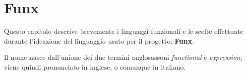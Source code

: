 \chapter{Funx}
\label{chap:2-funx}

Questo capitolo descrive brevemente i linguaggi funzionali e le scelte effettuate
durante l'ideazione del linguaggio usato per il progetto: \textbf{Funx}.

\noindent Il nome nasce dall'unione dei due termini anglosassoni \textit{functional} e \textit{expression};
viene quindi pronunciato \textipa{["f2nIk"s]} in inglese, o comunque  in italiano.





\newpage



